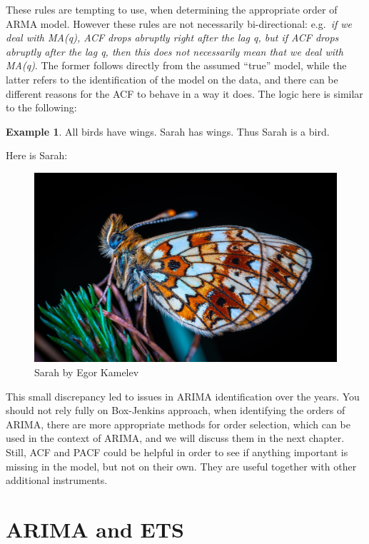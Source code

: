 \documentclass[
]{book}
\theoremstyle{definition}
\theoremstyle{definition}
\newtheorem{example}{Example}[chapter]
\theoremstyle{definition}
\theoremstyle{definition}
\theoremstyle{remark}
\begin{document}
These rules are tempting to use, when determining the appropriate order of ARMA model. However these rules are not necessarily bi-directional: e.g.~\emph{if we deal with MA(q), ACF drops abruptly right after the lag q, but if ACF drops abruptly after the lag q, then this does not necessarily mean that we deal with MA(q)}. The former follows directly from the assumed ``true'' model, while the latter refers to the identification of the model on the data, and there can be different reasons for the ACF to behave in a way it does. The logic here is similar to the following:

\begin{example}
\protect\hypertarget{exm:unnamed-chunk-59}{}{\label{exm:unnamed-chunk-59} }All birds have wings. Sarah has wings. Thus Sarah is a bird.

Here is Sarah:
\end{example}

\begin{figure}
\includegraphics[width=0.75\linewidth]{./images/09-Sarah} \caption{Sarah by Egor Kamelev}\label{fig:SarahButterfly}
\end{figure}

This small discrepancy led to issues in ARIMA identification over the years. You should not rely fully on Box-Jenkins approach, when identifying the orders of ARIMA, there are more appropriate methods for order selection, which can be used in the context of ARIMA, and we will discuss them in the next chapter. Still, ACF and PACF could be helpful in order to see if anything important is missing in the model, but not on their own. They are useful together with other additional instruments.

\hypertarget{ARIMAandETS}{%
\section{ARIMA and ETS}\label{ARIMAandETS}}
\end{document}
